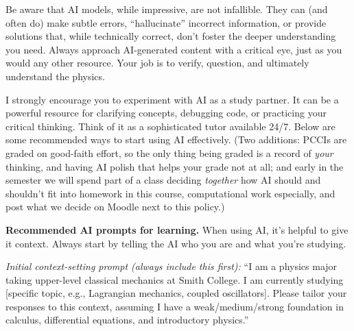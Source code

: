 \medskip
Be aware that AI models, while impressive, are not infallible. They can
(and often do) make subtle errors, ``hallucinate'' incorrect information,
or provide solutions that, while technically correct, don't foster the
deeper understanding you need. Always approach AI-generated content with
a critical eye, just as you would any other resource. Your job is to
verify, question, and ultimately understand the physics.

\medskip
I strongly encourage you to experiment with AI as a study partner. It can
be a powerful resource for clarifying concepts, debugging code, or
practicing your critical thinking. Think of it as a sophisticated tutor
available 24/7. Below are some recommended ways to start using AI
effectively. (Two additions: PCCIs are graded on good-faith
effort, so the only thing being graded is a record of \emph{your}
thinking, and having AI polish that helps your grade not at all; and
early in the semester we will spend part of a class deciding
\emph{together} how AI should and shouldn't fit into homework in this
course, computational work especially, and post what we decide on Moodle
next to this policy.)

\medskip
\textbf{Recommended AI prompts for learning.} When using AI, it's helpful
to give it context. Always start by telling the AI who you are and what
you're studying.

\medskip
\emph{Initial context-setting prompt (always include this first):} ``I am
a physics major taking upper-level classical mechanics at Smith College.
I am currently studying [specific topic, e.g., Lagrangian mechanics,
coupled oscillators]. Please tailor your responses to this context,
assuming I have a weak/medium/strong foundation in calculus, differential
equations, and introductory physics.''

